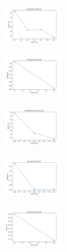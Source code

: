 \begin{figure}[H]
    \hfill
    \begin{subfigure}
        \centering
        \includegraphics[width=0.234\textwidth]{img/copkm2/ecoli_set_const_20_589741062_time.png}
    \end{subfigure}
    \hfill
    \begin{subfigure}
        \centering
        \includegraphics[width=0.234\textwidth]{img/copkm2/rand_set_const_20_589741062_time.png}
    \end{subfigure}
    \hfill
    \begin{subfigure}
        \centering
        \includegraphics[width=0.234\textwidth]{img/copkm2/newthyroid_set_const_20_589741062_time.png}
    \end{subfigure}
    \hfill
    \begin{subfigure}
        \centering
        \includegraphics[width=0.234\textwidth]{img/copkm2/iris_set_const_20_277451237_time.png}
    \end{subfigure}
    \hfill
    \begin{subfigure}
        \centering
        \includegraphics[width=0.234\textwidth]{img/copkm2/ecoli_set_const_20_277451237_time.png}
    \end{subfigure}
    \hfill
    \begin{subfigure}

\end{subfigure}
\end{figure}
